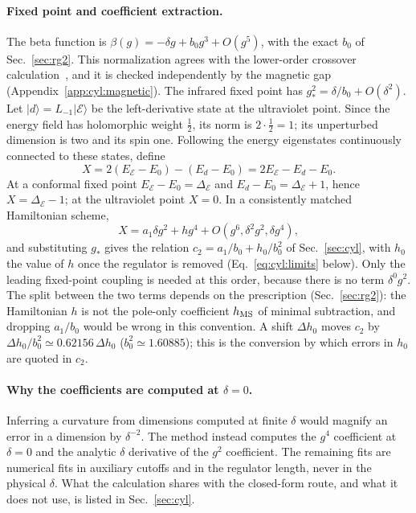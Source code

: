 \documentclass[11pt,a4paper]{article}
\numberwithin{equation}{section}
\newcommand{\De}{\Delta_{\mathcal E}}
\newcommand{\hMS}{h_{\rm MS}}
\newcommand{\ket}[1]{\lvert#1\rangle}
\begin{document}
\paragraph{Fixed point and coefficient extraction.} The beta function is $\beta(g)=-\delta g+b_0g^3+O(g^5)$, with the
exact $b_0$ of Sec.~\ref{sec:rg2}. This normalization agrees with the lower-order crossover
calculation~\cite{Behan:2017emf}, and it is checked independently by the magnetic gap (Appendix~\ref{app:cyl:magnetic}).
The infrared fixed point has $g_*^2=\delta/b_0+O(\delta^2)$. Let $\ket d=L_{-1}\ket{\mathcal E}$ be the left-derivative
state at the ultraviolet point. Since the energy field has holomorphic weight $\frac12$, its norm is $2\cdot\frac12=1$;
its unperturbed dimension is two and its spin one. Following the energy eigenstates continuously connected to these
states, define
\begin{equation}
 X=2(E_{\mathcal E}-E_0)-(E_d-E_0)=2E_{\mathcal E}-E_d-E_0.
 \label{eq:cyl:X}
\end{equation}
At a conformal fixed point $E_{\mathcal E}-E_0=\De$ and $E_d-E_0=\De+1$, hence $X=\De-1$; at the ultraviolet point
$X=0$. In a consistently matched Hamiltonian scheme,
\begin{equation}
 X=a_1\delta g^2+hg^4+O(g^6,\delta^2g^2,\delta g^4),
\end{equation}
and substituting $g_*$ gives the relation $c_2=a_1/b_0+h_0/b_0^2$ of Sec.~\ref{sec:cyl}, with $h_0$ the value of
$h$ once the regulator is removed (Eq.~\eqref{eq:cyl:limits} below). Only the leading fixed-point coupling is needed at
this order, because there is no term $\delta^0g^2$. The split between the two terms depends on the prescription
(Sec.~\ref{sec:rg2}): the Hamiltonian $h$ is not the pole-only coefficient $\hMS$ of minimal subtraction, and dropping
$a_1/b_0$ would be wrong in this convention. A shift $\Delta h_0$ moves $c_2$ by $\Delta h_0/b_0^2\simeq0.62156\,\Delta
h_0$ ($b_0^2\simeq1.60885$); this is the conversion by which errors in $h_0$ are quoted in $c_2$.

\paragraph{Why the coefficients are computed at $\delta=0$.} Inferring a curvature from dimensions computed at finite
$\delta$ would magnify an error in a dimension by $\delta^{-2}$. The method instead computes the $g^4$ coefficient at
$\delta=0$ and the analytic $\delta$ derivative of the $g^2$ coefficient. The remaining fits are numerical fits in
auxiliary cutoffs and in the regulator length, never in the physical $\delta$. What the calculation shares with the
closed-form route, and what it does not use, is listed in Sec.~\ref{sec:cyl}.
\end{document}
